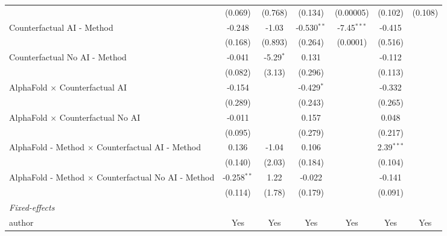 \begin{tabular}{lcccccc}
                                                              & (0.069)       & (0.768)     & (0.134)       & (0.00005)     & (0.102)       & (0.108)\\   
   Counterfactual AI - Method                                 & -0.248        & -1.03       & -0.530$^{**}$ & -7.45$^{***}$ & -0.415        &   \\   
                                                              & (0.168)       & (0.893)     & (0.264)       & (0.0001)      & (0.516)       &   \\   
   Counterfactual No AI - Method                              & -0.041        & -5.29$^{*}$ & 0.131         &               & -0.112        &   \\   
                                                              & (0.082)       & (3.13)      & (0.296)       &               & (0.113)       &   \\   
   AlphaFold $\times$ Counterfactual AI                       & -0.154        &             & -0.429$^{*}$  &               & -0.332        &   \\   
                                                              & (0.289)       &             & (0.243)       &               & (0.265)       &   \\   
   AlphaFold $\times$ Counterfactual No AI                    & -0.011        &             & 0.157         &               & 0.048         &   \\   
                                                              & (0.095)       &             & (0.279)       &               & (0.217)       &   \\   
   AlphaFold - Method $\times$ Counterfactual AI - Method     & 0.136         & -1.04       & 0.106         &               & 2.39$^{***}$  &   \\   
                                                              & (0.140)       & (2.03)      & (0.184)       &               & (0.104)       &   \\   
   AlphaFold - Method $\times$ Counterfactual No AI - Method  & -0.258$^{**}$ & 1.22        & -0.022        &               & -0.141        &   \\   
                                                              & (0.114)       & (1.78)      & (0.179)       &               & (0.091)       &   \\   
   \midrule
   \emph{Fixed-effects}\\
   author                                                     & Yes           & Yes         & Yes           & Yes           & Yes           & Yes\\  

\end{tabular}

